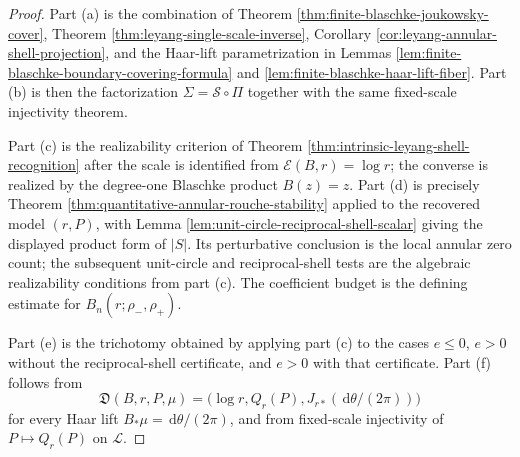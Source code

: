 \documentclass[12pt,a4paper]{article}
\theoremstyle{plain}
\theoremstyle{definition}
\numberwithin{equation}{section}
\newcommand{\dd}{\,\mathrm{d}}
\begin{document}
\begin{proof}
Part \textup{(a)} is the combination of Theorem
\ref{thm:finite-blaschke-joukowsky-cover}, Theorem
\ref{thm:leyang-single-scale-inverse}, Corollary
\ref{cor:leyang-annular-shell-projection}, and the Haar-lift
parametrization in Lemmas
\ref{lem:finite-blaschke-boundary-covering-formula} and
\ref{lem:finite-blaschke-haar-lift-fiber}.  Part \textup{(b)} is then the
factorization \(\Sigma=\mathcal S\circ\Pi\) together with the same
fixed-scale injectivity theorem.

Part \textup{(c)} is the realizability criterion of Theorem
\ref{thm:intrinsic-leyang-shell-recognition} after the scale is identified
from \(\mathcal E(B,r)=\log r\); the converse is realized by the
degree-one Blaschke product \(B(z)=z\).  Part \textup{(d)} is precisely
Theorem \ref{thm:quantitative-annular-rouche-stability} applied to the
recovered model \((r,P)\), with Lemma
\ref{lem:unit-circle-reciprocal-shell-scalar} giving the displayed
product form of \(|S|\).  Its perturbative conclusion is the local
annular zero count; the subsequent unit-circle and reciprocal-shell tests
are the algebraic realizability conditions from part \textup{(c)}.  The
coefficient budget is the defining estimate for
\(B_n(r;\rho_-,\rho_+)\).

Part \textup{(e)} is the trichotomy obtained by applying part
\textup{(c)} to the cases \(e\le0\), \(e>0\) without the reciprocal-shell
certificate, and \(e>0\) with that certificate.  Part \textup{(f)} follows
from
\[
\mathfrak D(B,r,P,\mu)
=\bigl(\log r,Q_r(P),J_{r\ast}(\dd\theta/(2\pi))\bigr)
\]
for every Haar lift \(B_\ast\mu=\dd\theta/(2\pi)\), and from
fixed-scale injectivity of \(P\mapsto Q_r(P)\) on \(\mathcal L\).
\end{proof}



\end{document}
